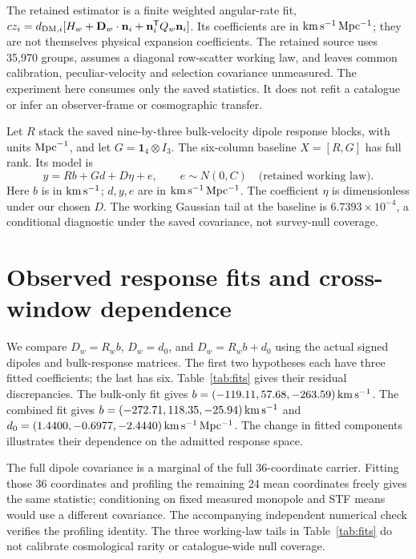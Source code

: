 \documentclass[aps,prd,reprint,onecolumn,superscriptaddress,nofootinbib]{revtex4-2}
\begin{document}
The retained estimator is a finite weighted angular-rate fit, $cz_i=d_{{\rm DM},i}[H_w+\mathbf D_w\cdot\mathbf n_i+\mathbf n_i^{\mathsf T}Q_w\mathbf n_i]$. Its coefficients are in ${\rm km\,s^{-1}\,Mpc^{-1}}$; they are not themselves physical expansion coefficients. The retained source uses 35,970 groups, assumes a diagonal row-scatter working law, and leaves common calibration, peculiar-velocity and selection covariance unmeasured. The experiment here consumes only the saved statistics. It does not refit a catalogue or infer an observer-frame or cosmographic transfer.

Let $R$ stack the saved nine-by-three bulk-velocity dipole response blocks, with units ${\rm Mpc}^{-1}$, and let $G=\mathbf 1_4\otimes I_3$. The six-column baseline $X=[R,G]$ has full rank. Its model is
\begin{equation}
 y=Rb+Gd+D\eta+e,\qquad e\sim N(0,C)\quad\text{(retained working law)}.
 \label{eq:model}
\end{equation}
Here $b$ is in ${\rm km\,s^{-1}}$; $d,y,e$ are in ${\rm km\,s^{-1}\,Mpc^{-1}}$. The coefficient $\eta$ is dimensionless under our chosen $D$. The working Gaussian tail at the baseline is $6.7393\times10^{-4}$, a conditional diagnostic under the saved covariance, not survey-null coverage.

\section{Observed response fits and cross-window dependence}

We compare $D_w=R_wb$, $D_w=d_0$, and $D_w=R_wb+d_0$ using the actual signed dipoles and bulk-response matrices. The first two hypotheses each have three fitted coefficients; the last has six. Table~\ref{tab:fits} gives their residual discrepancies. The bulk-only fit gives $b=(-119.11,57.68,-263.59)\,{\rm km\,s^{-1}}$. The combined fit gives $b=(-272.71,118.35,-25.94)\,{\rm km\,s^{-1}}$ and $d_0=(1.4400,-0.6977,-2.4440)\,{\rm km\,s^{-1}\,Mpc^{-1}}$. The change in fitted components illustrates their dependence on the admitted response space.

The full dipole covariance is a marginal of the full 36-coordinate carrier. Fitting those 36 coordinates and profiling the remaining 24 mean coordinates freely gives the same statistic; conditioning on fixed measured monopole and STF means would use a different covariance. The accompanying independent numerical check verifies the profiling identity. The three working-law tails in Table~\ref{tab:fits} do not calibrate cosmological rarity or catalogue-wide null coverage.
\end{document}
